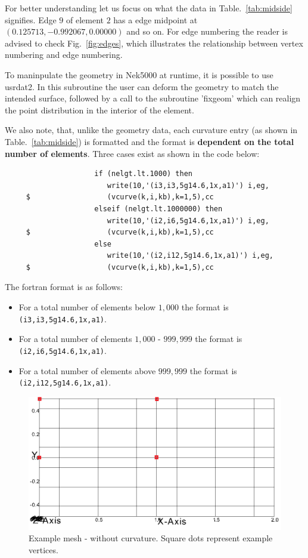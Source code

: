 \begin{description}
For better understanding let us focus on what the data in Table.~\ref{tab:midside} signifies. Edge $9$ of element $2$ has a edge  midpoint at $(0.125713, -0.992067, 0.00000)$  and so on. For edge numbering the reader is advised to check Fig.~\ref{fig:edges}, which illustrates the relationship between vertex numbering and edge numbering.

To maninpulate the geometry in Nek5000 at runtime, it is possible to use  usrdat2. In this subroutine the user can deform the geometry to match the intended surface, followed by a call to the subroutine 'fixgeom' which can realign the point distribution in the interior of the element.

We also note, that, unlike the geometry data, each curvature entry (as shown in Table.~\ref{tab:midside}) is formatted and the format is {\bf dependent on the total number of elements}. Three cases exist as shown in the code below: 
\footnotesize
\begin{verbatim}
                     if (nelgt.lt.1000) then
                        write(10,'(i3,i3,5g14.6,1x,a1)') i,eg,
     $                  (vcurve(k,i,kb),k=1,5),cc
                     elseif (nelgt.lt.1000000) then
                        write(10,'(i2,i6,5g14.6,1x,a1)') i,eg,
     $                  (vcurve(k,i,kb),k=1,5),cc
                     else
                        write(10,'(i2,i12,5g14.6,1x,a1)') i,eg,
     $                  (vcurve(k,i,kb),k=1,5),cc
\end{verbatim}
\normalsize
The fortran format is as follows:
\begin{itemize}
\item For a total number of elements below $1,000$ the format is \texttt{(i3,i3,5g14.6,1x,a1)}.
\item For a total number of elements $1,000$ - $999,999$ the format is \texttt{(i2,i6,5g14.6,1x,a1)}.
\item For a total number of elements above $999,999$ the format is \texttt{(i2,i12,5g14.6,1x,a1)}.
\end{itemize}


\begin{figure}
\begin{center}
\includegraphics[scale=0.5]{Figs/base1.png}
\caption{Example mesh - without curvature. Square dots represent example vertices.}
\label{fig:ex1}
\end{center}
\end{figure}


\end{description}
